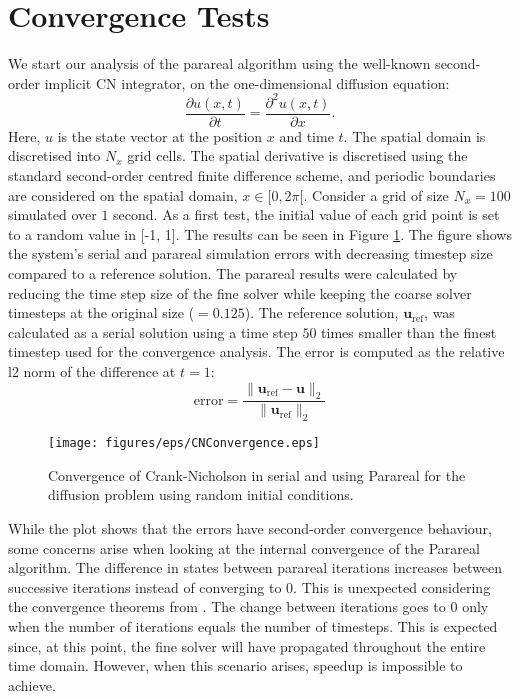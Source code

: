 \section{Convergence Tests}
\label{sec: convergence}
We start our analysis of the parareal algorithm using the well-known second-order implicit CN integrator, on the one-dimensional diffusion equation:
\begin{equation}
    \frac{\partial u(x,t)}{\partial t} = \frac{\partial^2 u(x, t)}{\partial x}.
\end{equation}
Here, $u$ is the state vector at the position $x$ and time $t$. The spatial domain is discretised into $N_x$ grid cells. The spatial derivative is discretised using the standard second-order centred finite difference scheme, and periodic boundaries are considered on the spatial domain, $x \in [0,2\pi[$. 
Consider a grid of size $N_x = 100$ simulated over $1$ second. As a first test, the initial value of each grid point is set to a random value  in [-1, 1]. The results can be seen in Figure \ref{fig: CN-convergence-random}. The figure shows the system's serial and parareal simulation errors with decreasing timestep size compared to a reference solution. The parareal results were calculated by reducing the time step size of the fine solver while keeping the coarse solver timesteps at the original size ($= 0.125$). The reference solution, $\textbf{u}_{\mathrm{ref}}$, was calculated as a serial solution using a time step $50$ times smaller than the finest timestep used for the convergence analysis. The error is computed as the relative l2 norm of the difference at $t=1$:
\[\mathrm{error} = \frac{\|\textbf{u}_{\mathrm{ref}} - \textbf{u}\|_2}{\| \textbf{u}_{\mathrm{ref}}\|_2}\]
\begin{figure}[h]
    \centering
    \texttt{[image: figures/eps/CNConvergence.eps]}
    \caption{Convergence of Crank-Nicholson in serial and using Parareal for the diffusion problem using random initial conditions. }
    \label{fig: CN-convergence-random}
\end{figure}
\newline 
While the plot shows that the errors have second-order convergence behaviour, some concerns arise when looking at the internal convergence of the Parareal algorithm. The difference in states between parareal iterations increases between successive iterations instead of converging to 0. This is unexpected considering the convergence theorems from \cite{gander_analysis_2007}. The change between iterations goes to 0 only when the number of iterations equals the number of timesteps. This is expected since, at this point, the fine solver will have propagated throughout the entire time domain. However, when this scenario arises, speedup is impossible to achieve.  
